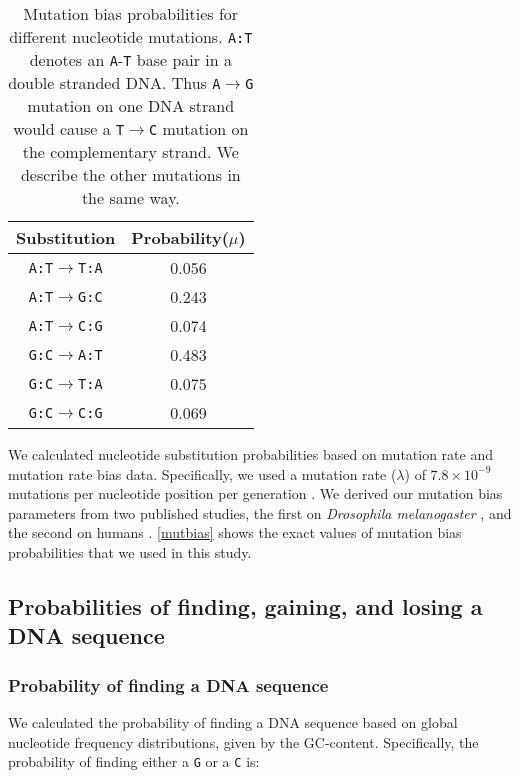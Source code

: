 \documentclass[12pt,a4paper]{article}
\begin{document}
\begin{table}[H]
\centering
\begin{tabular}{c c}
\toprule
\textbf{Substitution} & Probability($\mu$) \\\midrule
\texttt{A:T}$\to$\texttt{T:A} & 0.056 \\\midrule
\texttt{A:T}$\to$\texttt{G:C} & 0.243 \\\midrule
\texttt{A:T}$\to$\texttt{C:G} & 0.074 \\\midrule
\texttt{G:C}$\to$\texttt{A:T} & 0.483 \\\midrule
\texttt{G:C}$\to$\texttt{T:A} & 0.075 \\\midrule
\texttt{G:C}$\to$\texttt{C:G} & 0.069 \\\bottomrule
\end{tabular}
\caption{Mutation bias probabilities for different nucleotide mutations. \texttt{A:T} denotes an \texttt{A}-\texttt{T} base pair in a double stranded DNA. Thus \texttt{A}$\to$\texttt{G} mutation on one DNA strand would cause a \texttt{T}$\to$\texttt{C} mutation on the complementary strand. We describe the other mutations in the same way.}
\label{mutbias}
\end{table}

We calculated nucleotide substitution probabilities based on mutation rate and mutation rate bias data. Specifically, we  used a mutation rate ($\lambda$) of $7.8\times10^{-9}$ mutations per nucleotide position per generation \citep{drosophilamutrate}. We derived our mutation bias parameters from two published studies, the first on \textit{Drosophila melanogaster} \citep{drosophilamutrate}, and the second on humans \citep{humanmutrate}. \autoref{mutbias} shows the exact values of mutation bias probabilities that we used in this study.



\subsection{Probabilities of finding, gaining, and losing a DNA sequence}
\label{methbasic}

\subsubsection{Probability of finding a DNA sequence}
\label{methprob}

We calculated the probability of finding a DNA sequence based on global nucleotide frequency distributions, given by the GC-content. Specifically, the probability of finding either a \texttt{G} or a \texttt{C} is: 
\end{document}
